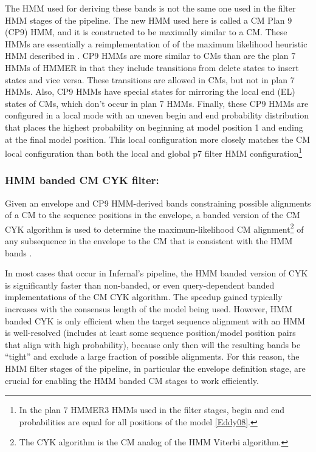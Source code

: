 \begin{sreoutput}
The HMM used for deriving these bands is not the same one used in the
filter HMM stages of the pipeline. The new HMM used here is called a
CM Plan 9 (CP9) HMM, and it is constructed to be maximally similar to
a CM. These HMMs are essentially a reimplementation of of the maximum
likelihood heuristic HMM described in \citep{WeinbergRuzzo06}. 
CP9 HMMs are more similar to CMs than are the plan 7 HMMs of HMMER in
that they include transitions from delete states to insert states and
vice versa. These transitions are allowed in CMs, but not in plan 7
HMMs. Also, CP9 HMMs have special states for mirroring the local end
(EL) states of CMs, which don't occur in plan 7 HMMs.  Finally, these
CP9 HMMs are configured in a local mode with an uneven begin and end
probability distribution that places the highest probability on
beginning at model position 1 and ending at the final model position.
This local configuration more closely matches the CM local
configuration than both the local and global p7 filter HMM
configuration\footnote{In the plan 7 HMMER3 HMMs used in the filter
  stages, begin and end probabilities are equal for all positions of
  the model \ref{Eddy08}.}

\subsubsection{HMM banded CM CYK filter:}

Given an envelope and CP9 HMM-derived bands constraining possible
alignments of a CM to the sequence positions in the envelope, a banded
version of the CM CYK algorithm is used to determine the
maximum-likelihood CM alignment\footnote{The CYK algorithm is the CM
analog of the HMM Viterbi algorithm.} of any subsequence in the
envelope to the CM that is consistent with the HMM bands \citep{Nawrocki09}.

In most cases that occur in Infernal's pipeline, the HMM banded
version of CYK is significantly faster than non-banded, or even
query-dependent banded \citep{NawrockiEddy07} implementations of the CM
CYK algorithm. The speedup gained typically increases with the
consensus length of the model being used. However, HMM banded CYK is
only efficient when the target sequence alignment with an HMM is
well-resolved (includes at least some sequence position/model position
pairs that align with high probability), because only then will 
the resulting bands be ``tight'' and exclude a large fraction of
possible alignments. For this reason, the HMM filter stages of the
pipeline, in particular the envelope definition stage, are crucial for
enabling the HMM banded CM stages to work efficiently. 


\end{sreoutput}
